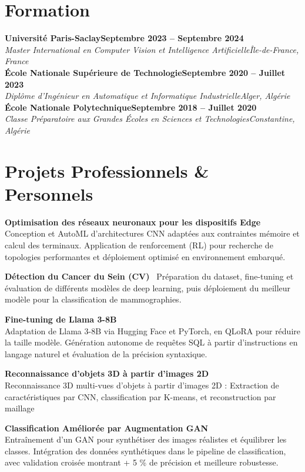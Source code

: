 \documentclass[letterpaper,10pt]{article}
\newcommand{\heading}[2]{
  \hspace{10pt}#1\hfill#2\\
}
\newcommand{\headingBf}[2]{
  \heading{\textbf{#1}}{\textbf{#2}}
}
\newcommand{\headingIt}[2]{
  \heading{\textit{#1}}{\textit{#2}}
}
\newenvironment{resume_list}{
  \vspace{-7pt}
  \begin{itemize}[itemsep=-2px, parsep=1pt, leftmargin=30pt]
}{
  \end{itemize}
}
\begin{document}
\section{Formation}

\headingBf{Université Paris-Saclay}{Septembre 2023 -- Septembre 2024}
\headingIt{Master International en Computer Vision et Intelligence Artificielle}{Île-de-France, France}

\headingBf{École Nationale Supérieure de Technologie}{Septembre 2020 -- Juillet 2023}
\headingIt{Diplôme d’Ingénieur en Automatique et Informatique Industrielle}{Alger, Algérie}

\headingBf{École Nationale Polytechnique}{Septembre 2018 -- Juillet 2020}
\headingIt{Classe Préparatoire aux Grandes Écoles en Sciences et Technologies}{Constantine, Algérie}


\section{Projets Professionnels \& Personnels}
\begin{resume_list}
  \item \textbf{Optimisation des réseaux neuronaux pour les dispositifs Edge} \\
  Conception et AutoML d’architectures CNN adaptées aux contraintes mémoire et calcul des terminaux.  
  Application de renforcement (RL) pour recherche de topologies performantes et déploiement optimisé en environnement embarqué.
  
\item \textbf{Détection du Cancer du Sein (CV)} \
    Préparation du dataset, fine-tuning et évaluation de différents modèles de deep learning, puis déploiement du meilleur modèle pour la classification de mammographies.
  
  \item \textbf{Fine-tuning de Llama 3-8B} \\
  Adaptation de Llama 3-8B via Hugging Face et PyTorch, en QLoRA pour réduire la taille modèle.  
  Génération autonome de requêtes SQL à partir d’instructions en langage naturel et évaluation de la précision syntaxique.
  
  \item \textbf{Reconnaissance d’objets 3D à partir d’images 2D} \\
  Reconnaissance 3D multi-vues d’objets à partir d’images 2D : Extraction de caractéristiques par CNN, classification par K-means, et reconstruction par maillage
  \item \textbf{Classification Améliorée par Augmentation GAN} \\
  Entraînement d’un GAN pour synthétiser des images réalistes et équilibrer les classes.  
  Intégration des données synthétiques dans le pipeline de classification, avec validation croisée montrant + 5 \% de précision et meilleure robustesse.
\end{resume_list}
\end{document}
